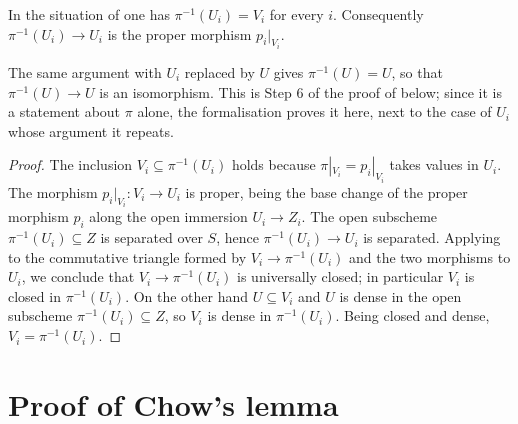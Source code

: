 \begin{lemma}\label{lem:chow-preimage}
\leanok
In the situation of  one has $\pi^{-1}(U_i)=V_i$ for every
$i$.  Consequently $\pi^{-1}(U_i)\to U_i$ is the proper morphism
$p_i|_{V_i}$.

The same argument with $U_i$ replaced by $U$ gives $\pi^{-1}(U)=U$, so that
$\pi^{-1}(U)\to U$ is an isomorphism.  This is Step 6 of the proof of
 below; since it is a statement about $\pi$ alone, the
formalisation proves it here, next to the case of $U_i$ whose argument it
repeats.
\end{lemma}
\begin{proof}
\leanok
The inclusion $V_i\subseteq\pi^{-1}(U_i)$ holds because $\pi|_{V_i}=p_i|_{V_i}$
takes values in $U_i$.  The morphism $p_i|_{V_i}\colon V_i\to U_i$ is proper,
being the base change of the proper morphism $p_i$ along the open immersion
$U_i\to Z_i$.  The open subscheme $\pi^{-1}(U_i)\subseteq Z$ is separated over
$S$, hence $\pi^{-1}(U_i)\to U_i$ is separated.  Applying 
to the commutative triangle formed by $V_i\to\pi^{-1}(U_i)$ and the two
morphisms to $U_i$, we conclude that $V_i\to\pi^{-1}(U_i)$ is universally
closed; in particular $V_i$ is closed in $\pi^{-1}(U_i)$.  On the other hand
$U\subseteq V_i$ and $U$ is dense in the open subscheme
$\pi^{-1}(U_i)\subseteq Z$, so $V_i$ is dense in $\pi^{-1}(U_i)$.  Being closed
and dense, $V_i=\pi^{-1}(U_i)$.
\end{proof}

\section{Proof of Chow's lemma}\label{sec:chow-lemma-proof}

